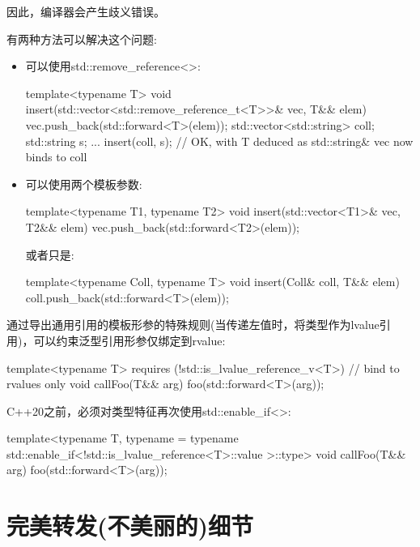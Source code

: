 因此，编译器会产生歧义错误。\par

有两种方法可以解决这个问题:\par

\begin{itemize}
  \item 可以使用std::remove\_reference<>:
\begin{codebox}[cpp]
  template<typename T>
  void insert(std::vector<std::remove_reference_t<T>>& vec, T&& elem)
  {
    vec.push_back(std::forward<T>(elem));
  }
  std::vector<std::string> coll;
  std::string s;
  ...
  insert(coll, s); // OK, with T deduced as std::string& vec now binds to coll
\end{codebox}
  \item 可以使用两个模板参数:
\begin{codebox}[cpp]
  template<typename T1, typename T2>
  void insert(std::vector<T1>& vec, T2&& elem)
  {
    vec.push_back(std::forward<T2>(elem));
  }
\end{codebox}
  或者只是:\par
\begin{codebox}[cpp]
  template<typename Coll, typename T>
  void insert(Coll& coll, T&& elem)
  {
    coll.push_back(std::forward<T>(elem));
  }
\end{codebox}
\end{itemize}


通过导出通用引用的模板形参的特殊规则(当传递左值时，将类型作为lvalue引用)，可以约束泛型引用形参仅绑定到rvalue:\par

\begin{codebox}[cpp]
template<typename T>
requires (!std::is_lvalue_reference_v<T>) // bind to rvalues only
void callFoo(T&& arg) {
  foo(std::forward<T>(arg));
}
\end{codebox}

C++20之前，必须对类型特征再次使用std::enable\_if<>:\par

\begin{codebox}[cpp]
template<typename T,
  typename
    = typename std::enable_if<!std::is_lvalue_reference<T>::value
      >::type>
void callFoo(T&& arg) {
  foo(std::forward<T>(arg));
}
\end{codebox}


\section{完美转发(不美丽的)细节}

